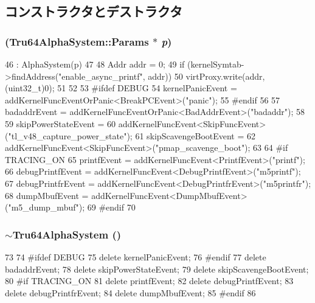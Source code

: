\subsection{コンストラクタとデストラクタ}
\hypertarget{classTru64AlphaSystem_a5b0ae66b648ea464fceae312db22bb1a}{
\subsubsection[{Tru64AlphaSystem}]{ ({\bf Tru64AlphaSystem::Params} $\ast$ {\em p})}}
\label{classTru64AlphaSystem_a5b0ae66b648ea464fceae312db22bb1a}



\begin{DoxyCode}
46     : AlphaSystem(p)
47 {
48     Addr addr = 0;
49     if (kernelSymtab->findAddress("enable_async_printf", addr)) {
50         virtProxy.write(addr, (uint32_t)0);
51     }
52 
53 #ifdef DEBUG
54     kernelPanicEvent = addKernelFuncEventOrPanic<BreakPCEvent>("panic");
55 #endif
56 
57     badaddrEvent = addKernelFuncEventOrPanic<BadAddrEvent>("badaddr");
58 
59     skipPowerStateEvent =
60         addKernelFuncEvent<SkipFuncEvent>("tl_v48_capture_power_state");
61     skipScavengeBootEvent =
62         addKernelFuncEvent<SkipFuncEvent>("pmap_scavenge_boot");
63 
64 #if TRACING_ON
65     printfEvent = addKernelFuncEvent<PrintfEvent>("printf");
66     debugPrintfEvent = addKernelFuncEvent<DebugPrintfEvent>("m5printf");
67     debugPrintfrEvent = addKernelFuncEvent<DebugPrintfrEvent>("m5printfr");
68     dumpMbufEvent = addKernelFuncEvent<DumpMbufEvent>("m5_dump_mbuf");
69 #endif
70 }
\end{DoxyCode}
\hypertarget{classTru64AlphaSystem_af9fd4c006ca0b7da440766328643c6e8}{
\subsubsection[{$\sim$Tru64AlphaSystem}]{\setlength{\rightskip}{0pt plus 5cm}$\sim${\bf Tru64AlphaSystem} ()}}
\label{classTru64AlphaSystem_af9fd4c006ca0b7da440766328643c6e8}



\begin{DoxyCode}
73 {
74 #ifdef DEBUG
75     delete kernelPanicEvent;
76 #endif
77     delete badaddrEvent;
78     delete skipPowerStateEvent;
79     delete skipScavengeBootEvent;
80 #if TRACING_ON
81     delete printfEvent;
82     delete debugPrintfEvent;
83     delete debugPrintfrEvent;
84     delete dumpMbufEvent;
85 #endif
86 }
\end{DoxyCode}


